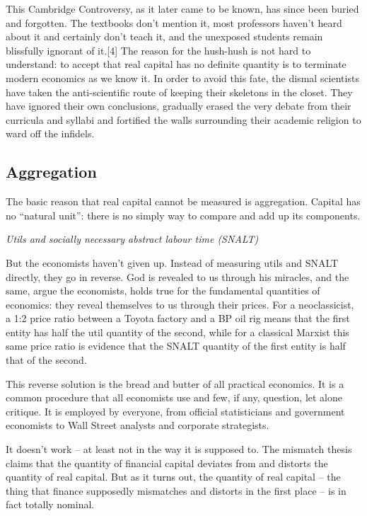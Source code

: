 \documentclass[
]{book}
\begin{document}
This Cambridge Controversy, as it later came to be known, has since been buried and forgotten. The textbooks don't mention it, most professors haven't heard about it and certainly don't teach it, and the unexposed students remain blissfully ignorant of it.{[}4{]} The reason for the hush-hush is not hard to understand: to accept that real capital has no definite quantity is to terminate modern economics as we know it. In order to avoid this fate, the dismal scientists have taken the anti-scientific route of keeping their skeletons in the closet. They have ignored their own conclusions, gradually erased the very debate from their curricula and syllabi and fortified the walls surrounding their academic religion to ward off the infidels.

\hypertarget{aggregation}{%
\subsection{Aggregation}\label{aggregation}}

The basic reason that real capital cannot be measured is aggregation.
Capital has no ``natural unit'': there is no simply way to compare and add up its components.

\emph{Utils and socially necessary abstract labour time (SNALT)}

But the economists haven't given up. Instead of measuring utils and SNALT directly, they go in reverse. God is revealed to us through his miracles, and the same, argue the economists, holds true for the fundamental quantities of economics: they reveal themselves to us through their prices. For a neoclassicist, a 1:2 price ratio between a Toyota factory and a BP oil rig means that the first entity has half the util quantity of the second, while for a classical Marxist this same price ratio is evidence that the SNALT quantity of the first entity is half that of the second.

This reverse solution is the bread and butter of all practical economics. It is a common procedure that all economists use and few, if any, question, let alone critique. It is employed by everyone, from official statisticians and government economists to Wall Street analysts and corporate strategists.

It doesn't work -- at least not in the way it is supposed to.
The mismatch thesis claims that the quantity of financial capital deviates from and distorts the quantity of real capital. But as it turns out, the quantity of real capital -- the thing that finance supposedly mismatches and distorts in the first place -- is in fact totally nominal.
\end{document}
